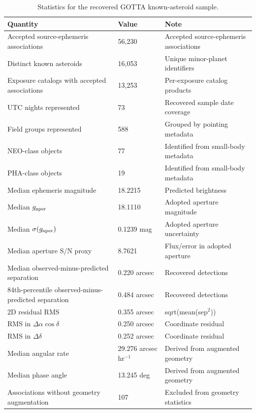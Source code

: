 \begin{table}
\centering
\caption{Statistics for the recovered GOTTA known-asteroid sample.}
\label{tab:summary}
\footnotesize
\setlength{\tabcolsep}{6pt}
\renewcommand{\arraystretch}{1.12}
\begin{tabular}{p{}p{}p{}}
\toprule
Quantity & Value & Note \\
\midrule
Accepted source-ephemeris associations & 56,230 & Accepted source-ephemeris associations \\
Distinct known asteroids & 16,053 & Unique minor-planet identifiers \\
Exposure catalogs with accepted associations & 13,253 & Per-exposure catalog products \\
UTC nights represented & 73 & Recovered sample date coverage \\
Field groups represented & 588 & Grouped by pointing metadata \\
NEO-class objects & 77 & Identified from small-body metadata \\
PHA-class objects & 19 & Identified from small-body metadata \\
Median ephemeris magnitude & 18.2215 & Predicted brightness \\
Median $g_{\rm aper}$ & 18.1110 & Adopted aperture magnitude \\
Median $\sigma(g_{\rm aper})$ & 0.1239 mag & Adopted aperture uncertainty \\
Median aperture S/N proxy & 8.7621 & Flux/error in adopted aperture \\
Median observed-minus-predicted separation & 0.220 arcsec & Recovered detections \\
84th-percentile observed-minus-predicted separation & 0.484 arcsec & Recovered detections \\
2D residual RMS & 0.355 arcsec & sqrt(mean(sep$^2$)) \\
RMS in $\Delta\alpha\cos\delta$ & 0.250 arcsec & Coordinate residual \\
RMS in $\Delta\delta$ & 0.252 arcsec & Coordinate residual \\
Median angular rate & 29.276 arcsec hr$^{-1}$ & Derived from augmented geometry \\
Median phase angle & 13.245 deg & Derived from augmented geometry \\
Associations without geometry augmentation & 107 & Excluded from geometry statistics \\
\bottomrule
\end{tabular}
\end{table}
